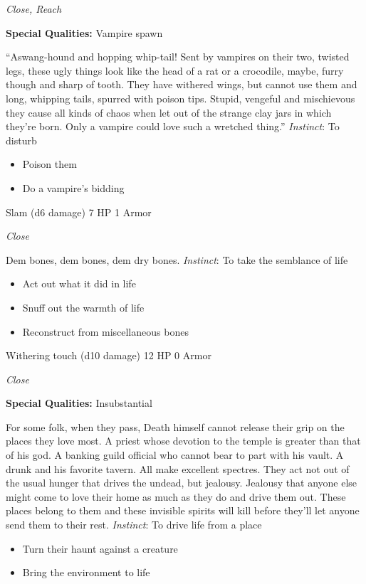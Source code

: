 \emph{Close, Reach}

\textbf{Special Qualities:}
Vampire spawn

\HRule
``Aswang-hound and hopping whip-tail! Sent by vampires on their two, twisted legs, these ugly things look like the head of a rat or a crocodile, maybe, furry though and sharp of tooth. They have withered wings, but cannot use them and long, whipping tails, spurred with poison tips. Stupid, vengeful and mischievous they cause all kinds of chaos when let out of the strange clay jars in which they're born. Only a vampire could love such a wretched thing.'' \emph{Instinct}: To disturb
\begin{itemize}
\item Poison them
\item Do a vampire's bidding
\end{itemize}

\HRule
{}

Slam (d6 damage)\hspace*{\fill} 7 HP 1 Armor

\emph{Close}

\HRule
Dem bones, dem bones, dem dry bones. \emph{Instinct}: To take the semblance of life
\begin{itemize}
\item Act out what it did in life
\item Snuff out the warmth of life
\item Reconstruct from miscellaneous bones
\end{itemize}
\newpage
\HRule
{}

Withering touch (d10 damage)\hspace*{\fill} 12 HP 0 Armor

\emph{Close}

\textbf{Special Qualities:}
Insubstantial

\HRule
For some folk, when they pass, Death himself cannot release their grip on the places they love most. A priest whose devotion to the temple is greater than that of his god. A banking guild official who cannot bear to part with his vault. A drunk and his favorite tavern. All make excellent spectres. They act not out of the usual hunger that drives the undead, but jealousy. Jealousy that anyone else might come to love their home as much as they do and drive them out. These places belong to them and these invisible spirits will kill before they'll let anyone send them to their rest. \emph{Instinct}: To drive life from a place
\begin{itemize}
\item Turn their haunt against a creature
\item Bring the environment to life
\end{itemize}

